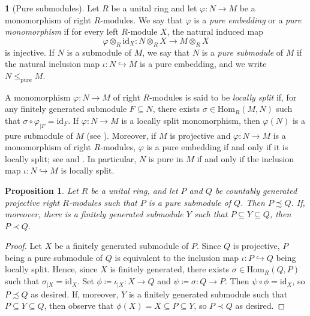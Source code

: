 \documentclass[11pt]{amsart}
\numberwithin{equation}{section}
\newtheorem{prp}[prpCt]{Proposition}
\theoremstyle{definition}
\newtheorem{pgr}[pgrCt]{}
\theoremstyle{plain}
\theoremstyle{definition}
\begin{document}
\begin{pgr}[Pure submodules]
\label{pgr:pure}
Let $R$ be a unital ring and let $\varphi \colon N \rightarrow M$ be a monomorphism of right $R$-modules. We say that $\varphi$ is a \emph{pure embedding} or a \emph{pure monomorphism} if for every left $R$-module $X$, the natural induced map
\begin{equation*}
    \varphi \otimes_R \mathrm{id}_X  \colon N \otimes_R X \longrightarrow M \otimes_R X
\end{equation*}
is injective. If $N$ is a submodule of $M$, we say that $N$ is a \emph{pure submodule} of $M$ if the natural inclusion map $\iota \colon N \hookrightarrow M$ is a pure embedding, and we write $N \leq_{\mathrm{pure}} M$. 

A monomorphism $\varphi \colon N \rightarrow M$ of right $R$-modules is said to be \emph{locally split} if, for any finitely generated submodule $F \subseteq N$, there exists $\sigma \in \mathrm{Hom}_R(M, N)$ such that $\sigma\circ\varphi_{|F} = \mathrm{id}_{F}$. If $\varphi \colon N \rightarrow M$ is a locally split monomorphism, then $\varphi(N)$ is a pure submodule of $M$ (see \cite[Exercise 4.38, p. 163]{lam1999lectures}). Moreover, if $M$ is projective and $\varphi \colon N \rightarrow M$ is a monomorphism of right $R$-modules, $\varphi$ is a pure embedding if and only if it is locally split; see \cite[Theorem 8]{Field72RegRings} and \cite[Proposition 2.2]{Chase1960}. In particular, $N$ is pure in $M$ if and only if the inclusion map $\iota \colon N \hookrightarrow M$ is locally split. 
\end{pgr}

\begin{prp} \label{impl right to left}
Let $R$ be a unital ring, and let $P$ and $Q$ be countably generated projective right $R$-modules such that $P$ is a pure submodule of $Q$. Then $P \precsim Q$. If, moreover, there is a finitely generated submodule $Y$ such that $P \subseteq Y \subseteq Q$, then $P \prec Q$. 
\end{prp} 

\begin{proof}
Let $X$ be a finitely generated submodule of $P$. Since $Q$ is projective, $P$ being a pure submodule of $Q$ is equivalent to the inclusion map $\iota\colon P \hookrightarrow Q$ being locally split. Hence, since $X$ is finitely generated, there exists $\sigma \in \mathrm{Hom}_R(Q, P)$ such that $\sigma_{|X} = \mathrm{id}_{X}$. Set $\phi \coloneqq \iota_{|X} \colon X \rightarrow Q$ and $\psi \coloneqq \sigma \colon Q \rightarrow P$. Then $\psi \circ \phi = \mathrm{id}_{X}$, so $P \precsim Q$ as desired. If, moreover, $Y$ is a finitely generated submodule such that $P \subseteq Y \subseteq Q$, then observe that $\phi(X) = X \subseteq P \subseteq Y$, so $P \prec Q$ as desired.  
\end{proof}
\end{document}
